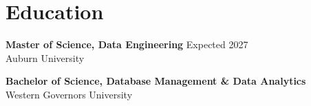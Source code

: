 \section{Education}

\textbf{Master of Science, Data Engineering} \hfill Expected 2027\\
Auburn University

\vspace{3pt}

\textbf{Bachelor of Science, Database Management \& Data Analytics}\\
Western Governors University